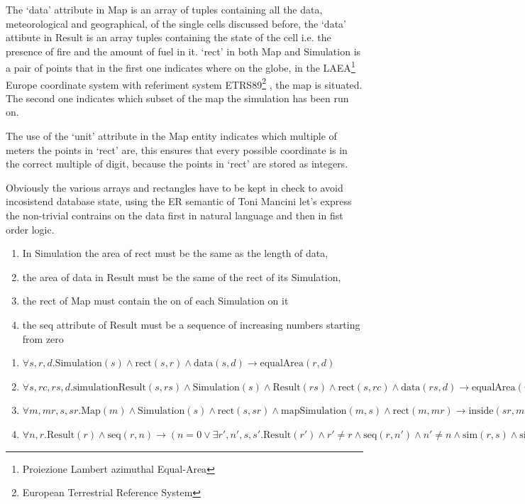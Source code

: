 \documentclass[Lau]{sapthesis} %
\begin{document}
The `data' attribute in Map is an array of tuples containing all the data,
meteorological and geographical, of the single cells discussed before, the
`data' attibute in Result is an array tuples containing the state of the cell
i.e. the presence of fire and the amount of fuel in it. `rect' in both Map and
Simulation is a pair of points that in the first one indicates where on the
globe, in the LAEA\footnote{Proiezione Lambert azimuthal Equal-Area} Europe
\cite{laeae} coordinate system with referiment system ETRS89\footnote{European
Terrestrial Reference System} \cite{etrs89}, the map is situated. The second one
indicates which subset of the map the simulation has been run on.

The use of the `unit' attribute in the Map entity indicates which multiple of
meters the points in `rect' are, this ensures that every possible coordinate is
in the correct multiple of digit, because the points in `rect' are stored as
integers.

Obviously the various arrays and rectangles have to be kept in check to avoid
incosistend database state, using the ER semantic of Toni Mancini \cite{bd2}
let's express the non-trivial contrains on the data first in natural language
and then in fist order logic.

\begin{enumerate}
\item In Simulation the area of rect must be the same as the length of data,
\item the area of data in Result must be the same of the rect of its Simulation,
\item the rect of Map must contain the on of each Simulation on it
\item the seq attribute of Result must be a sequence of increasing numbers
starting from zero
\end{enumerate}

\begin{enumerate}
\item $\forall s,r,d.\textrm{Simulation}(s)
	\land \textrm{rect}(s,r)
	\land \textrm{data}(s,d)
	\rightarrow \textrm{equalArea}(r,d)$
\item $\forall s,rc,rs,d.\textrm{simulationResult}(s,rs) \allowbreak
	\land \textrm{Simulation}(s) \allowbreak
	\land \textrm{Result}(rs) \allowbreak
	\land \textrm{rect}(s,rc) \allowbreak
	\land \textrm{data}(rs,d) \allowbreak
	\rightarrow\textrm{equalArea}(rc,d)$
\item $\forall m,mr,s,sr. \textrm{Map}(m)
	\land \textrm{Simulation}(s) \allowbreak
	\land \textrm{rect}(s,sr) \allowbreak
	\land \textrm{mapSimulation}(m,s) \allowbreak
	\land \textrm{rect}(m,mr) \allowbreak
	\rightarrow \textrm{inside}(sr,mr)$
\item $\forall n,r.\textrm{Result}(r)
	\land\textrm{seq}(r,n)
	\rightarrow
	(n=0 \lor \exists r',n',s,s'.\textrm{Result}(r')
		\land r'\neq r
		\land \textrm{seq}(r,n')
		\land n'\neq n
		\land \textrm{sim}(r,s)
		\land \textrm{sim}(r',s')
		\land s'=s\rightarrow n'=n-1)$
\end{enumerate}
\end{document}
